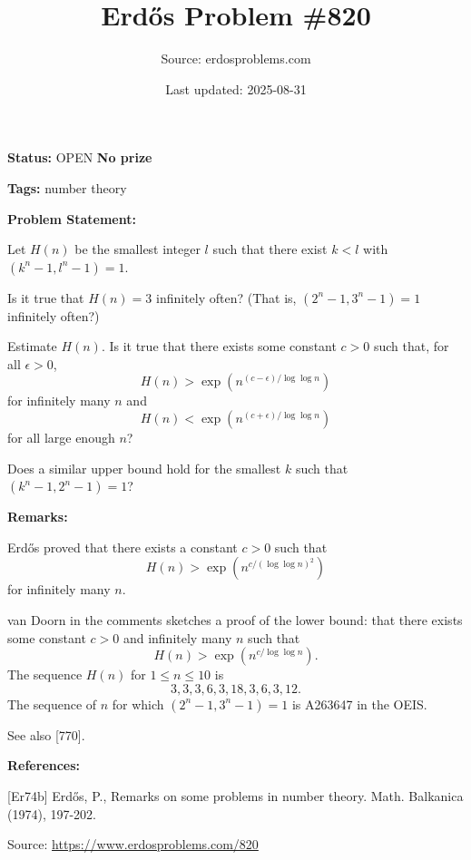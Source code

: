 \documentclass{article}
\title{Erd\H{o}s Problem \#820}
\date{Last updated: 2025-08-31}
\author{Source: erdosproblems.com}
\begin{document}
\maketitle

\noindent\textbf{Status:} OPEN \quad \textbf{No prize}

\noindent\textbf{Tags:} number theory

\medskip
\noindent\textbf{Problem Statement:}

Let $H(n)$ be the smallest integer $l$ such that there exist $k<l$ with $(k^n-1,l^n-1)=1$.

Is it true that $H(n)=3$ infinitely often? (That is, $(2^n-1,3^n-1)=1$ infinitely often?)

Estimate $H(n)$. Is it true that there exists some constant $c>0$ such that, for all $\epsilon>0$,\[H(n) > \exp(n^{(c-\epsilon)/\log\log n})\]for infinitely many $n$ and\[H(n) < \exp(n^{(c+\epsilon)/\log\log n})\]for all large enough $n$?

Does a similar upper bound hold for the smallest $k$ such that $(k^n-1,2^n-1)=1$?

\bigskip
\noindent\textbf{Remarks:}

Erd\H{o}s \cite{Er74b} proved that there exists a constant $c>0$ such that\[H(n) > \exp(n^{c/(\log\log n)^2})\]for infinitely many $n$.

van Doorn in the comments sketches a proof of the lower bound: that there exists some constant $c>0$ and infinitely many $n$ such that\[H(n) > \exp(n^{c/\log\log n}).\]The sequence $H(n)$ for $1\leq n\leq 10$ is\[3,3,3,6,3,18,3,6,3,12.\]The sequence of $n$ for which $(2^n-1,3^n-1)=1$ is A263647 in the OEIS.

See also [770].

\bigskip
\noindent\textbf{References:}

[Er74b] Erd\H{o}s, P., Remarks on some problems in number theory. Math. Balkanica (1974), 197-202.

\bigskip
\noindent\small{Source: \url{https://www.erdosproblems.com/820}}
\end{document}
